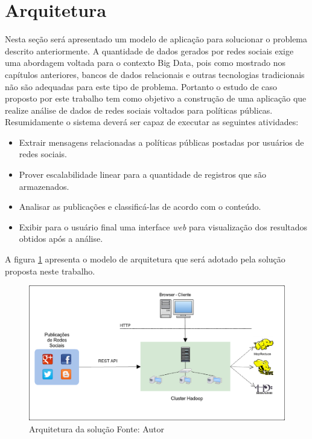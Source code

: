 \section{Arquitetura}

Nesta seção será apresentado um modelo de aplicação para solucionar o problema descrito anteriormente. A quantidade de dados gerados por redes sociais exige uma abordagem voltada para o contexto Big Data, pois como mostrado nos capítulos anteriores, bancos de dados relacionais e outras tecnologias tradicionais não são adequadas para este tipo de problema. Portanto o estudo de caso proposto por este trabalho tem como objetivo a construção de uma aplicação que realize análise de dados de redes sociais voltados para políticas públicas. Resumidamente o sistema deverá ser capaz de executar as seguintes atividades:

\begin{itemize}
  \item Extrair mensagens relacionadas a políticas públicas postadas por usuários de redes sociais.
  \item Prover escalabilidade linear para a quantidade de registros que são armazenados.
  \item Analisar as publicações e classificá-las de acordo com o conteúdo.
  \item Exibir para o usuário final uma interface \textit{web} para visualização dos resultados obtidos após a análise.
\end{itemize}

A figura \ref{fig-proposta} apresenta o modelo de arquitetura que será adotado pela solução proposta neste trabalho. 

\begin{figure}[ht!]
	\centering
	\includegraphics[keepaspectratio=true,scale=0.35]
	  {figuras/proposta.eps}
	\caption[Arquitetura da solução]{Arquitetura da solução
	\protect\linebreak Fonte: Autor}
	\label{fig-proposta}
\end{figure}
\FloatBarrier

